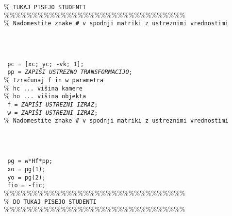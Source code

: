 \begin{mdframed}[backgroundcolor=yellow!20, shadow=true,roundcorner=8pt]
\begin{enumerate}
\textcolor[rgb]{0.50,0.50,0.50}{\texttt{$\%$  TUKAJ PISEJO STUDENTI}} \\%
\textcolor[rgb]{0.50,0.50,0.50}{\texttt{$\%\%\%\%\%\%\%\%\%\%\%\%\%\%\%\%\%\%\%\%\%\%\%\%\%\%\%\%\%\%\%\%$ }} \\%
\textcolor[rgb]{0.50,0.50,0.50}{\texttt{$\%$  Nadomestite znake \emph{\#} v spodnji matriki z ustreznimi vrednostimi}} \\%
\texttt{\tab{H = [} } \\
\texttt{\tab{} } \\
\texttt{\tab{} } \\
\texttt{\tab{} \tab{\emph{\#}  \emph{\#}  \emph{\#}  \emph{\#}];}} \\
\texttt{    pc = [xc; yc; -vk; 1];} \\
\texttt{    pp = \emph{ZAPIŠI USTREZNO TRANSFORMACIJO};}\\
\textcolor[rgb]{0.50,0.50,0.50}{\texttt{$\%$  Izračunaj f in w parametra}} \\%
\textcolor[rgb]{0.50,0.50,0.50}{\texttt{$\%$  hc ... višina kamere}} \\%
\textcolor[rgb]{0.50,0.50,0.50}{\texttt{$\%$  ho ... višina objekta}} \\%
\texttt{    f = \emph{ZAPIŠI USTREZNI IZRAZ};} \\
\texttt{    w = \emph{ZAPIŠI USTREZNI IZRAZ};}\\
\textcolor[rgb]{0.50,0.50,0.50}{\texttt{$\%$  Nadomestite znake \emph{\#} v spodnji matriki z ustreznimi vrednostimi}} \\%
\texttt{\tab{Hf = [} } \\
\texttt{\tab{} } \\
\texttt{\tab{} } \\
\texttt{\tab{} \tab{\emph{\#}  \emph{\#}  \emph{\#}  \emph{\#}];}}\\
\texttt{    pg = w*Hf*pp;} \\
\texttt{    xo = pg(1);} \\
\texttt{    yo = pg(2);} \\
\texttt{    fio = -fic;} \\
\textcolor[rgb]{0.50,0.50,0.50}{\texttt{$\%\%\%\%\%\%\%\%\%\%\%\%\%\%\%\%\%\%\%\%\%\%\%\%\%\%\%\%\%\%\%\%$ }} \\%
\textcolor[rgb]{0.50,0.50,0.50}{\texttt{$\%$  DO TUKAJ PISEJO STUDENTI}} \\%
\textcolor[rgb]{0.50,0.50,0.50}{\texttt{$\%\%\%\%\%\%\%\%\%\%\%\%\%\%\%\%\%\%\%\%\%\%\%\%\%\%\%\%\%\%\%\%$ }}
\normalsize %
\end{enumerate}

\end{mdframed}

